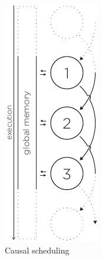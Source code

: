\begin{figure}
\begin{minipage}[t]{0.23\textwidth}
    \label{fig:sequential-scheduling}
  \end{minipage}
  \hspace{1cm}
  \vrule
  \hspace{1cm}
  \begin{minipage}[t]{0.23\textwidth}
    \centering
    \includegraphics[page=2, height=2\linewidth]{../resources/invariance.pdf}
    \caption{Causal scheduling}
    \label{fig:causal-scheduling}
  \end{minipage}
\end{figure}

